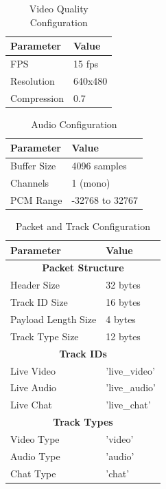 \begin{table}[h!]
\centering
\caption{Video Quality Configuration}
\label{tab:video-quality}
\renewcommand{\arraystretch}{1.3}
\begin{tabular}{|l|l|}
\hline
\textbf{Parameter} & \textbf{Value} \\
\hline
FPS & 15 fps \\
\hline
Resolution & 640x480 \\
\hline
Compression & 0.7 \\
\hline
\end{tabular}
\end{table}

\begin{table}[h!]
\centering
\caption{Audio Configuration}
\label{tab:audio-config}
\renewcommand{\arraystretch}{1.3}
\begin{tabular}{|l|l|}
\hline
\textbf{Parameter} & \textbf{Value} \\
\hline
Buffer Size & 4096 samples \\
\hline
Channels & 1 (mono) \\
\hline
PCM Range & -32768 to 32767 \\
\hline
\end{tabular}
\end{table}

\begin{table}[h!]
\centering
\caption{Packet and Track Configuration}
\label{tab:packet-track-config}
\renewcommand{\arraystretch}{1.3}
\begin{tabular}{|l|l|}
\hline
\textbf{Parameter} & \textbf{Value} \\
\hline
\multicolumn{2}{|c|}{\textbf{Packet Structure}} \\
\hline
Header Size & 32 bytes \\
\hline
Track ID Size & 16 bytes \\
\hline
Payload Length Size & 4 bytes \\
\hline
Track Type Size & 12 bytes \\
\hline
\multicolumn{2}{|c|}{\textbf{Track IDs}} \\
\hline
Live Video & 'live\_video' \\
\hline
Live Audio & 'live\_audio' \\
\hline
Live Chat & 'live\_chat' \\
\hline

\multicolumn{2}{|c|}{\textbf{Track Types}} \\
\hline
Video Type & 'video' \\
\hline
Audio Type & 'audio' \\
\hline
Chat Type & 'chat' \\
\hline
\end{tabular}
\end{table}

